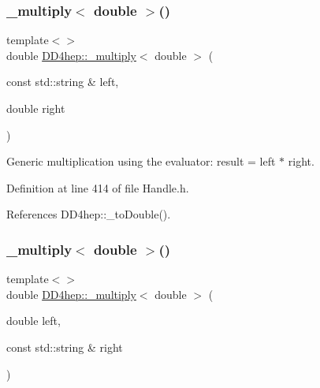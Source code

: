 \subsubsection{\texorpdfstring{\+\_\+multiply$<$ double $>$()}{\_multiply< double >()}\hspace{0.1cm}{\footnotesize\ttfamily [2/3]}}
{\footnotesize\ttfamily template$<$$>$ \\
double \hyperlink{group___d_d4_h_e_p___g_e_o_m_e_t_r_y_gab860c2299e2eb50e537c5079fb0c9c51}{D\+D4hep\+::\+\_\+multiply}$<$ double $>$ (\begin{DoxyParamCaption}\item[{const std\+::string \&}]{left,  }\item[{double}]{right }\end{DoxyParamCaption})\hspace{0.3cm}{\ttfamily [inline]}}



Generic multiplication using the evaluator\+: result = left $\ast$ right. 



Definition at line 414 of file Handle.\+h.



References D\+D4hep\+::\+\_\+to\+Double().

\hypertarget{group___d_d4_h_e_p___g_e_o_m_e_t_r_y_ga03961a16ebae2dd8a6750b65c5486ea2}{}\label{group___d_d4_h_e_p___g_e_o_m_e_t_r_y_ga03961a16ebae2dd8a6750b65c5486ea2} 
\subsubsection{\texorpdfstring{\+\_\+multiply$<$ double $>$()}{\_multiply< double >()}\hspace{0.1cm}{\footnotesize\ttfamily [3/3]}}
{\footnotesize\ttfamily template$<$$>$ \\
double \hyperlink{group___d_d4_h_e_p___g_e_o_m_e_t_r_y_gab860c2299e2eb50e537c5079fb0c9c51}{D\+D4hep\+::\+\_\+multiply}$<$ double $>$ (\begin{DoxyParamCaption}\item[{double}]{left,  }\item[{const std\+::string \&}]{right }\end{DoxyParamCaption})\hspace{0.3cm}{\ttfamily [inline]}}



